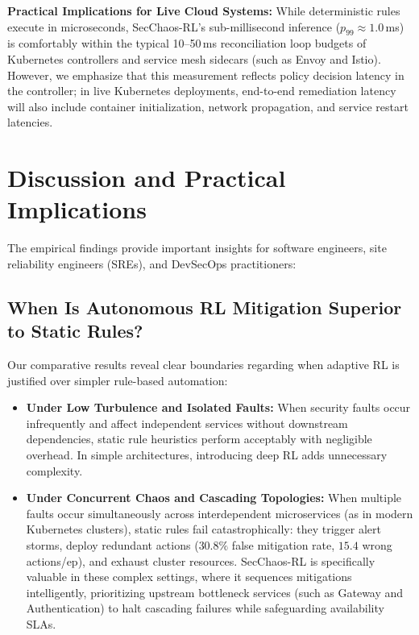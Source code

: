 \documentclass[11pt,a4paper]{article}
\begin{document}
\textbf{Practical Implications for Live Cloud Systems:} While deterministic rules execute in microseconds, SecChaos-RL's sub-millisecond inference ($p_{99} \approx 1.0$\,ms) is comfortably within the typical 10--50\,ms reconciliation loop budgets of Kubernetes controllers and service mesh sidecars (such as Envoy and Istio). However, we emphasize that this measurement reflects policy decision latency in the controller; in live Kubernetes deployments, end-to-end remediation latency will also include container initialization, network propagation, and service restart latencies.

\section{Discussion and Practical Implications}
\label{sec:discussion}

The empirical findings provide important insights for software engineers, site reliability engineers (SREs), and DevSecOps practitioners:

\subsection{When Is Autonomous RL Mitigation Superior to Static Rules?}
Our comparative results reveal clear boundaries regarding when adaptive RL is justified over simpler rule-based automation:
\begin{itemize}
    \item \textbf{Under Low Turbulence and Isolated Faults:} When security faults occur infrequently and affect independent services without downstream dependencies, static rule heuristics perform acceptably with negligible overhead. In simple architectures, introducing deep RL adds unnecessary complexity.
    \item \textbf{Under Concurrent Chaos and Cascading Topologies:} When multiple faults occur simultaneously across interdependent microservices (as in modern Kubernetes clusters), static rules fail catastrophically: they trigger alert storms, deploy redundant actions ($30.8\%$ false mitigation rate, $15.4$ wrong actions/ep), and exhaust cluster resources. SecChaos-RL is specifically valuable in these complex settings, where it sequences mitigations intelligently, prioritizing upstream bottleneck services (such as Gateway and Authentication) to halt cascading failures while safeguarding availability SLAs.
\end{itemize}
\end{document}
